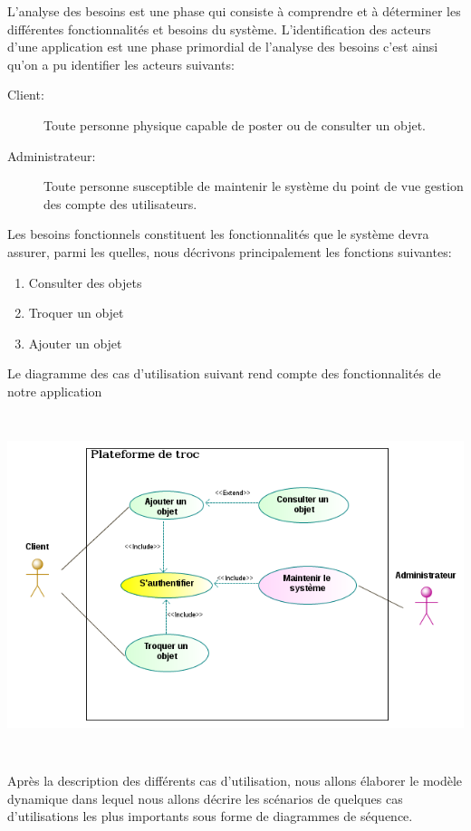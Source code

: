 \documentclass[12pt]{report}
\begin{document}
		\vspace{2em}
		L’analyse des besoins est une phase qui consiste à comprendre et à déterminer
		les différentes fonctionnalités et besoins du système.
		L'identification des acteurs d'une application est une phase primordial de l'analyse des besoins c'est ainsi qu'on a pu identifier les acteurs suivants:
		\begin{description}
			\item [\sc Client:] Toute personne physique capable de poster ou de consulter un objet.
			\item[\sc Administrateur:] Toute personne susceptible de maintenir le système du point de vue gestion des compte des utilisateurs.
		\end{description}
		 Les besoins fonctionnels constituent les fonctionnalités que le système devra assurer, parmi les
		 quelles, nous décrivons principalement les fonctions suivantes: 
		 \begin{enumerate}
		 	\item Consulter des objets
		 	\item Troquer un objet
		 	\item Ajouter un objet
		 \end{enumerate}
		 Le diagramme des cas d'utilisation suivant rend compte des fonctionnalités de notre application
			\begin{center}
				\includegraphics[scale=1, width=\textwidth, height=10cm]{usecase}
				\label{usecase}
			\end{center}
			
			Après la description des différents cas d’utilisation, nous allons élaborer le modèle dynamique
			dans lequel nous allons décrire les scénarios de quelques cas d’utilisations les plus importants sous forme de diagrammes de séquence.
			
\end{document}
